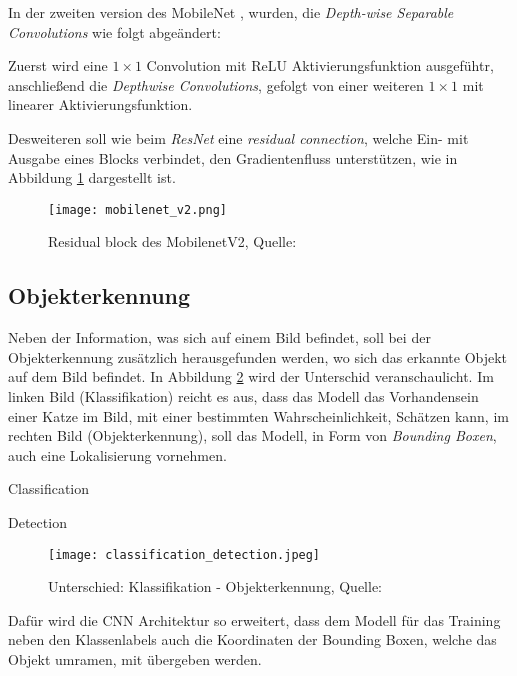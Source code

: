 In der zweiten version des MobileNet
\cite{sandlerMobileNetV2InvertedResiduals2019},
wurden, die \textit{Depth-wise Separable Convolutions}
wie folgt abgeändert:

Zuerst wird eine $1\times1$ Convolution mit ReLU
Aktivierungsfunktion ausgefühtr, anschließend die 
\textit{Depthwise Convolutions}, gefolgt 
von einer weiteren $1\times1$ mit linearer 
Aktivierungsfunktion.


Desweiteren soll wie beim \textit{ResNet} eine 
\textit{residual connection}, welche Ein- mit Ausgabe 
eines Blocks verbindet, 
den Gradientenfluss unterstützen, wie in Abbildung 
\ref{fig:mobilenetv2} dargestellt ist.
\vspace{1cm}
\begin{figure}[H]
    \centering
    \texttt{[image: mobilenet\_v2.png]}
    \caption{Residual block des MobilenetV2,
    Quelle: \cite{mobilenetv2Bild}}
    \label{fig:mobilenetv2}
\end{figure}


\subsection{Objekterkennung}\label{subsec:objdet_det}

Neben der Information, was sich auf einem Bild befindet, 
soll bei der Objekterkennung zusätzlich herausgefunden werden, 
wo sich das erkannte Objekt auf dem Bild befindet.
In Abbildung \ref{fig:class_vs_det} wird der Unterschid 
veranschaulicht. Im linken Bild (Klassifikation) 
reicht es aus, dass das Modell das Vorhandensein einer Katze
im Bild, mit einer bestimmten Wahrscheinlichkeit, Schätzen kann,
im rechten Bild (Objekterkennung), soll das Modell, 
in Form von \textit{Bounding Boxen}, auch eine 
Lokalisierung vornehmen.

\vspace{1cm}
\begin{minipage}{0.5\textwidth}
    \centering
    Classification
\end{minipage}
\begin{minipage}{0.5\textwidth}
    \centering
    Detection
\end{minipage}
\begin{figure}[H]
    \centering
    \texttt{[image: classification\_detection.jpeg]}
    \caption{Unterschied: Klassifikation - Objekterkennung, 
    Quelle: \cite{ouaknineReviewDeepLearning2018a}}
    \label{fig:class_vs_det}
\end{figure}
\vspace{1cm}
Dafür wird die CNN Architektur so erweitert, dass dem 
Modell für das Training neben den Klassenlabels auch
die Koordinaten der Bounding Boxen, welche das Objekt 
umramen, mit übergeben werden.

